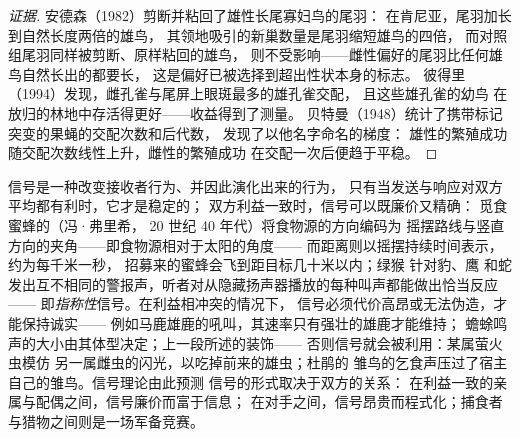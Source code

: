 \begin{proof}[证据]
安德森（1982）剪断并粘回了雄性长尾寡妇鸟的尾羽：
在肯尼亚，尾羽加长到自然长度两倍的雄鸟，
其领地吸引的新巢数量是尾羽缩短雄鸟的四倍，
而对照组尾羽同样被剪断、原样粘回的雄鸟，
则不受影响——雌性偏好的尾羽比任何雄鸟自然长出的都要长，
这是偏好已被选择到超出性状本身的标志。
彼得里（1994）发现，雌孔雀与尾屏上眼斑最多的雄孔雀交配，
且这些雄孔雀的幼鸟
在放归的林地中存活得更好——收益得到了测量。
贝特曼（1948）统计了携带标记突变的果蝇的交配次数和后代数，
发现了以他名字命名的梯度：
雄性的繁殖成功随交配次数线性上升，雌性的繁殖成功
在交配一次后便趋于平稳。
\end{proof}

\begin{proposition}[诚实信号]\label{prop:b3:behavioural-ecology:signals}
信号是一种改变接收者行为、并因此演化出来的行为，
只有当发送与响应对双方平均都有利时，它才是稳定的；
双方利益一致时，信号可以既廉价又精确：
觅食蜜蜂的\emph{}（冯·弗里希，
20 世纪 40 年代）将食物源的方向编码为
摇摆路线与竖直方向的夹角——即食物源相对于太阳的角度——
而距离则以摇摆持续时间表示，约为每千米一秒，
招募来的蜜蜂会飞到距目标几十米以内；绿猴
针对豹、鹰
和蛇发出互不相同的警报声，听者对从隐藏扬声器播放的每种叫声都能做出恰当反应——
即\emph{指称性}信号。在利益相冲突的情况下，
信号必须代价高昂或无法伪造，才能保持诚实——
例如马鹿雄鹿的吼叫，其速率只有强壮的雄鹿才能维持；
蟾蜍鸣声的大小由其体型决定；上一段所述的装饰——
否则信号就会被利用：某属萤火虫模仿
另一属雌虫的闪光，以吃掉前来的雄虫；杜鹃的
雏鸟的乞食声压过了宿主自己的雏鸟。信号理论由此预测
信号的形式取决于双方的关系：
在利益一致的亲属与配偶之间，信号廉价而富于信息；
在对手之间，信号昂贵而程式化；捕食者与猎物之间则是一场军备竞赛。
\end{proposition}
\admitted

